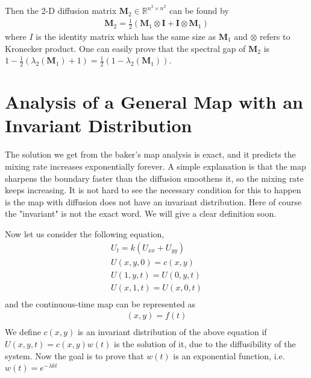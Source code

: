Then the 2-D diffusion matrix $\mathbf{M}_{2}\in\mathbb{R}^{n^{2}\times n^{2}}$ can be found by 
\begin{eqnarray*}
 \mathbf{M}_{2} = \frac{1}{2}\left( \mathbf{M}_{1}\otimes\mathbf{I}+ \mathbf{I}\otimes \mathbf{M}_{1} \right)
\end{eqnarray*}
where $I$ is the identity matrix which has the same size as $\mathbf{M}_{1}$ and $\otimes$ refers to Kronecker product. One can easily prove that the spectral gap of $\mathbf{M}_2$ is $1- \frac{1}{2}(\lambda_{2}(\mathbf{M}_1)+1) = \frac{1}{2}(1-\lambda_{2}(\mathbf{M}_1))$.




\section{Analysis of a General Map with an Invariant Distribution}
The solution we get from the baker's map analysis is exact, and it predicts the mixing rate increases exponentially forever. A simple explanation is that the map sharpens the boundary faster than the diffusion smoothens it, so the mixing rate keeps increasing. It is not hard to see the necessary condition for this to happen is the map with diffusion does not have an invariant distribution. Here of course the "invariant" is not the exact word. We will give a clear definition soon.

Now let us consider the following equation,
\begin{eqnarray*}
  U_{t} = k (U_{xx}+U_{yy})\\
  U(x,y,0) = c(x,y)\\
  U(1,y,t) = U(0,y,t)\\
  U(x,1,t) = U(x,0,t)\\
\end{eqnarray*}
and the continuous-time map can be represented as
\begin{eqnarray*}
  (x,y) = f(t)\\
\end{eqnarray*}
We define $c(x,y)$ is an invariant distribution of the above equation if $U(x,y,t) = c(x,y)w(t)$ is the solution of it, due to the diffusibility of the system. Now the goal is to prove that $w(t)$ is an exponential function, i.e. $w(t) = e^{-\lambda kt}$

